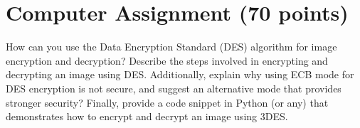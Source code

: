 \documentclass[12pt,oneside,oldfontcommands]{memoir}
\begin{document}
  \section*{Computer Assignment (70 points)}
    How can you use the Data Encryption Standard (DES) algorithm for image encryption and decryption? Describe the steps involved in encrypting and decrypting an image using DES. Additionally, explain why using ECB mode for DES encryption is not secure, and suggest an alternative mode that provides stronger security? Finally, provide a code snippet in Python (or any) that demonstrates how to encrypt and decrypt an image using 3DES.  
\end{document}
